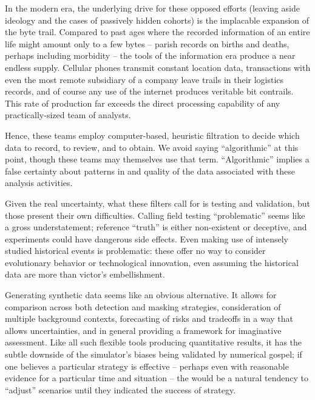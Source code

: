 \documentclass{article}
\newcommand{\todoCP}[1]{\todo{CP, #1}}
\begin{document}
In the modern era, the underlying drive for these opposed efforts (leaving aside ideology and the cases of passively hidden cohorts) is the implacable expansion of the byte trail.  Compared to past ages where the recorded information of an entire life might amount only to a few bytes -- parish records on births and deaths, perhaps including morbidity\todoCP{the right word?} -- the tools of the information era produce a near endless supply.  Cellular phones transmit constant location data, transactions with even the most remote subsidiary of a company leave trails in their logistics records, and of course any use of the internet produces veritable bit contrails.  This rate of production far exceeds the direct processing capability of any practically-sized team of analysts.

Hence, these teams employ computer-based, heuristic filtration to decide which data to record, to review, and to obtain.  We avoid saying ``algorithmic'' at this point, though these teams may themselves use that term.  ``Algorithmic'' implies a false certainty about patterns in and quality of the data associated with these analysis activities.

Given the real uncertainty, what these filters call for is testing and validation, but those present their own difficulties.  Calling field testing ``problematic'' seems like a gross understatement; reference ``truth'' is either non-existent or deceptive, and experiments could have dangerous side effects.  Even making use of intensely studied historical events is problematic: these offer no way to consider evolutionary behavior or technological innovation, even assuming the historical data are more than victor's embellishment.

Generating synthetic data seems like an obvious alternative.  It allows for comparison across both detection and masking strategies, consideration of multiple background contexts, forecasting of risks and tradeoffs in a way that allows uncertainties, and in general providing a framework for imaginative assessment.  Like all such flexible tools producing quantitative results, it has the subtle downside of the simulator's biases being validated by numerical gospel; if one believes a particular strategy is effective -- perhaps even with reasonable evidence for a particular time and situation -- the would be a natural tendency to ``adjust'' scenarios until they indicated the success of strategy.
\end{document}
